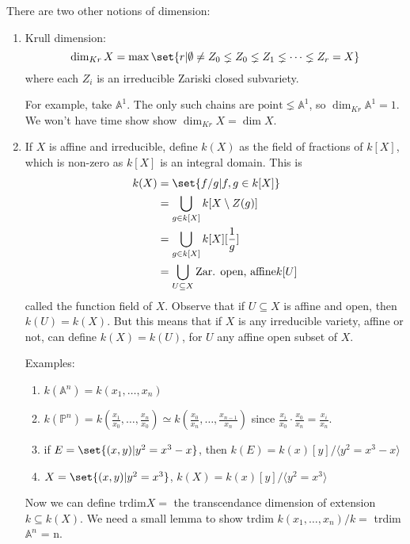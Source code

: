 \documentclass{article}
\newcommand{\A}{\mathbb{A}}
\newcommand{\proj}{\mathbb{P}}
\begin{document}
There are two other notions of dimension:
\begin{enumerate}[label=(\arabic*)]
    \item Krull dimension:
        \begin{equation*}
            \dim_{Kr} X = \max\set{r | \emptyset \neq Z_0 \lneq Z_0 \lneq Z_1 \lneq \dotsb \lneq Z_r = X}
        \end{equation*}
        where each $Z_i$ is an irreducible Zariski closed subvariety.

        For example, take $\A^1$. The only such chains are $\text{point} \lneq \A^1$, so $\dim_{Kr} \A^1 = 1$.
        We won't have time show show $\dim_{Kr} X = \dim X$.
    \item If $X$ is affine and irreducible, define $k(X)$ as the field of fractions of $k[X]$, which is non-zero as $k[X]$ is an integral domain.
        This is
        \begin{align*}
            k(X) &= \set{f/g | f, g \in k[X]} \\
                 &= \bigcup_{g \in k[X]} k[X \setminus Z(g)] \\
                 &= \bigcup_{g \in k[X]} k[X][\frac{1}{g}] \\
                 &= \bigcup_{U \subseteq X} \text{Zar. open, affine} k[U]
        \end{align*}
        called the function field of $X$.
        Observe that if $U \subseteq X$ is affine and open, then $k(U) = k(X)$.
        But this means that if $X$ is any irreducible variety, affine or not, can define $k(X) = k(U)$, for $U$ any affine open subset of $X$.

        Examples:
        \begin{enumerate}[label=(\roman*)]
            \item $k(\A^n) = k(x_1, \dotsc, x_n)$
            \item $k(\proj^n) = k(\frac{x_1}{x_0}, \dotsc, \frac{x_n}{x_0}) \simeq k(\frac{x_0}{x_n}, \dotsc, \frac{x_{n-1}}{x_n})$ since $\frac{x_i}{x_0} \cdot \frac{x_0}{x_n} = \frac{x_i}{x_n}$.
            \item if $E = \set{(x, y) | y^2 = x^3 - x}$, then $k(E) = k(x)[y]/\langle y^2 = x^3 - x \rangle$
            \item $X = \set{(x, y) | y^2 = x^3}$, $k(X) = k(x)[y] / \langle y^2 = x^3 \rangle$
        \end{enumerate}

        Now we can define $\text{trdim} X =$ the transcendance dimension of extension $k \subseteq k(X)$.
        We need a small lemma to show trdim $k(x_1, \dotsc, x_n)/k = $ trdim $\A^n$ = n.
\end{enumerate}
\end{document}
